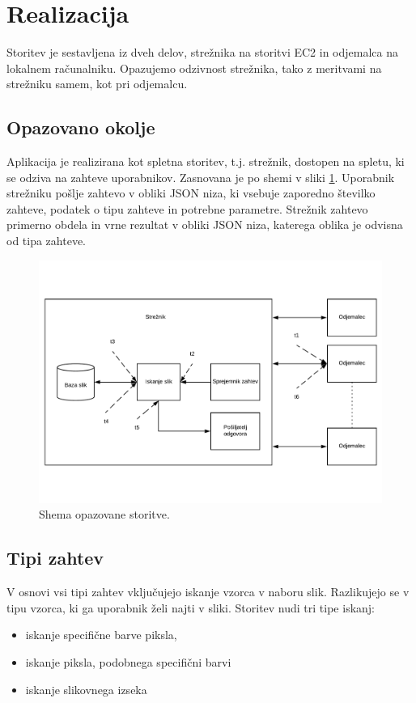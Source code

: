 \section{Realizacija}

Storitev je sestavljena iz dveh delov, strežnika na storitvi EC2 in odjemalca na lokalnem računalniku.
Opazujemo odzivnost strežnika, tako z meritvami na strežniku samem, kot pri odjemalcu.

\subsection{Opazovano okolje}

Aplikacija je realizirana kot spletna storitev, t.j. strežnik, dostopen na spletu, ki se odziva na zahteve uporabnikov.
Zasnovana je po shemi v sliki \ref{fig:1_osnovnaShema}.
Uporabnik strežniku pošlje zahtevo v obliki JSON niza, ki vsebuje zaporedno številko zahteve, podatek o tipu zahteve in potrebne parametre.
Strežnik zahtevo primerno obdela in vrne rezultat v obliki JSON niza, katerega oblika je odvisna od tipa zahteve.

\begin{figure}[H]
\centering
\includegraphics[scale=0.4]{Img/1_shema.pdf}
\caption{Shema opazovane storitve.}
\label{fig:1_osnovnaShema}
\end{figure}

\subsection{Tipi zahtev}

V osnovi vsi tipi zahtev vključujejo iskanje vzorca v naboru slik.
Razlikujejo se v tipu vzorca, ki ga uporabnik želi najti v sliki.
Storitev nudi tri tipe iskanj:
\begin{itemize}
\item iskanje specifične barve piksla,
\item iskanje piksla, podobnega specifični barvi
\item iskanje slikovnega izseka
\end{itemize}

